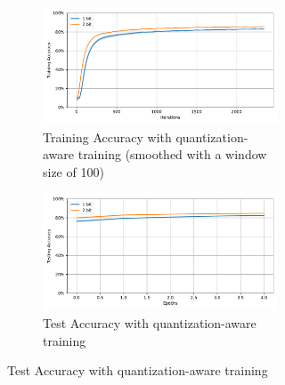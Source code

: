     \begin{figure}[!htpb]
        \centering
        \begin{subfigure}[H]{0.89\textwidth}
            \centering
            \begin{subfigure}[H]{\textwidth}
                \centering
                \includegraphics[width=\textwidth]{../quantized/FashionMNIST/plots/fashionmnist_train_acc.pdf}
                \caption{Training Accuracy with quantization-aware training (smoothed with a window size of 100)}
            \end{subfigure}
            \hfill
            \begin{subfigure}[H]{\textwidth}
                \centering
                \includegraphics[width=\textwidth]{../quantized/FashionMNIST/plots/fashionmnist_test_acc.pdf}
                \caption{Test Accuracy with quantization-aware training}
            \end{subfigure}
        \end{subfigure}
        \hfill
        \begin{subfigure}[H]{0.1\textwidth}
            \centering

\end{subfigure}
\end{figure}
